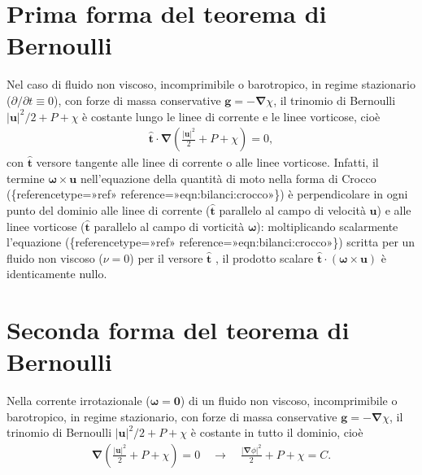 \documentclass[letterpaper,10pt,italian]{jupyterBook}
\begin{document}
\section{Prima forma del teorema di Bernoulli}
\label{\detokenize{polimi/fluidmechanics-ita/template/capitoli/05_bernoulli/05teoria:prima-forma-del-teorema-di-bernoulli}}
\sphinxAtStartPar
Nel caso di fluido non viscoso, incomprimibile o barotropico, in regime
stazionario (\(\partial / \partial t \equiv 0\)), con forze di massa
conservative \(\mathbf{g} = -\mathbf{\nabla} \chi\), il trinomio di Bernoulli
\(|\mathbf{u}|^2/2 + P + \chi\) è costante lungo le linee di corrente e le
linee vorticose, cioè
\begin{equation*}
\begin{split}\mathbf{\hat{t}} \cdot \mathbf{\nabla} \left( \frac{|\mathbf{u}|^2}{2} + P + \chi \right) = 0 ,\end{split}
\end{equation*}
\sphinxAtStartPar
con \(\mathbf{\hat{t}}\) versore tangente alle linee di corrente o alle linee
vorticose. Infatti, il termine \(\mathbf{\omega} \times \mathbf{u}\)
nell’equazione della quantità di moto nella forma di Crocco
(\{reference\sphinxhyphen{}type=»ref»
reference=»eqn:bilanci:crocco»\}) è perpendicolare in ogni punto del
dominio alle linee di corrente (\(\mathbf{\hat{t}}\) parallelo al campo di
velocità \(\mathbf{u}\)) e alle linee vorticose (\(\mathbf{\hat{t}}\) parallelo al
campo di vorticità \(\mathbf{\omega}\)): moltiplicando scalarmente l’equazione
(\{reference\sphinxhyphen{}type=»ref»
reference=»eqn:bilanci:crocco»\}) scritta per un fluido non viscoso
(\(\nu = 0\)) per il versore \(\mathbf{\hat{t}}\) , il prodotto scalare
\(\mathbf{\hat{t}} \cdot (\mathbf{\omega} \times \mathbf{u})\) è identicamente nullo.


\section{Seconda forma del teorema di Bernoulli}
\label{\detokenize{polimi/fluidmechanics-ita/template/capitoli/05_bernoulli/05teoria:seconda-forma-del-teorema-di-bernoulli}}
\sphinxAtStartPar
Nella corrente irrotazionale (\(\mathbf{\omega} = \mathbf{0}\)) di un fluido non
viscoso, incomprimibile o barotropico, in regime stazionario, con forze
di massa conservative \(\mathbf{g} = -\mathbf{\nabla} \chi\), il trinomio di
Bernoulli \(|\mathbf{u}|^2/2 + P + \chi\) è costante in tutto il dominio, cioè
\begin{equation*}
\begin{split}\mathbf{\nabla} \left( \frac{|\mathbf{u}|^2}{2} + P + \chi \right) = 0  \quad \rightarrow \quad 
  \frac{|\mathbf{\nabla} \phi|^2}{2} + P + \chi = C.\end{split}
\end{equation*}
\end{document}
